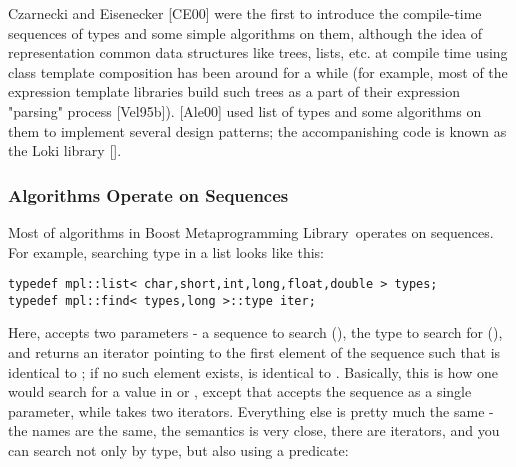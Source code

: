\documentclass{netobjectdays}
\newcommand{\Mpl}{Boost Meta\-program\-ming Library}
\begin{document}
Czarnecki and Eisenecker [CE00] were the first to introduce 
the compile-time sequences of types and some simple algorithms 
on them, although the idea of representation common data 
structures like trees, lists, etc. at compile time using class 
template composition has been around for a while (for example, 
most of the expression template libraries build such trees as 
a part of their expression "parsing" process [Vel95b]). 
[Ale00] used list of types and some algorithms on them to 
implement several design patterns; the accompanishing code 
is known as the Loki library []. 



\subsubsection{Algorithms Operate on Sequences}
  
Most of algorithms in \Mpl\ operates on sequences. For example, 
searching type in a list looks like this:

{\footnotesize
\begin{verbatim}
typedef mpl::list< char,short,int,long,float,double > types;
typedef mpl::find< types,long >::type iter;
\end{verbatim}
}

Here,  accepts two parameters - a sequence to search
(), the type to search for (), and returns an
iterator  pointing to the first element of the sequence
such that  is identical to ; if no such
element exists,  is identical to
. Basically, this is how one would search for a
value in  or , except that
 accepts the sequence as a single parameter,
while  takes two iterators.  Everything else is pretty
much the same - the names are the same, the semantics is very close,
there are iterators, and you can search not only by type, but also
using a predicate:
\end{document}
